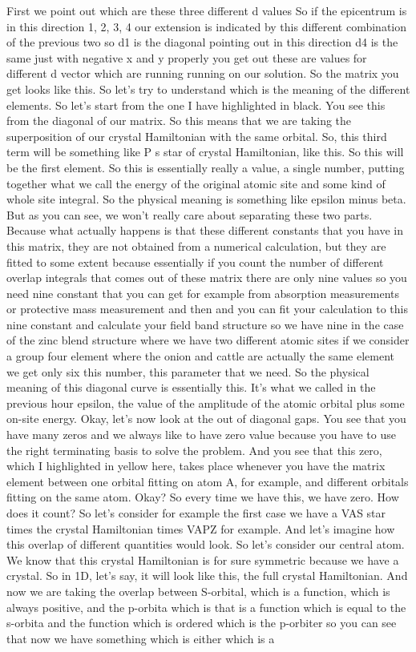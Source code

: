 First we point out which are these three different d values So if the epicentrum is in this direction 1, 2, 3, 4 our extension is indicated by this different combination of the previous two so d1 is the diagonal pointing out in this direction d4 is the same just with negative x and y properly you get out these are values for different d vector which are running running on our solution. So the matrix you get looks like this. So let's try to understand which is the meaning of the different elements. So let's start from the one I have highlighted in black. You see this from the diagonal of our matrix. So this means that we are taking the superposition of our crystal Hamiltonian with the same orbital. So, this third term will be something like P s star of crystal Hamiltonian, like this. So this will be the first element. So this is essentially really a value, a single number, putting together what we call the energy of the original atomic site and some kind of whole site integral. So the physical meaning is something like epsilon minus beta. But as you can see, we won't really care about separating these two parts. Because what actually happens is that these different constants that you have in this matrix, they are not obtained from a numerical calculation, but they are fitted to some extent because essentially if you count the number of different overlap integrals that comes out of these matrix there are only nine values so you need nine constant that you can get for example from absorption measurements or protective mass measurement and then and you can fit your calculation to this nine constant and calculate your field band structure so we have nine in the case of the zinc blend structure where we have two different atomic sites if we consider a group four element where the onion and cattle are actually the same element we get only six this number, this parameter that we need. So the physical meaning of this diagonal curve is essentially this. It's what we called in the previous hour epsilon, the value of the amplitude of the atomic orbital plus some on-site energy. Okay, let's now look at the out of diagonal gaps. You see that you have many zeros and we always like to have zero value because you have to use the right terminating basis to solve the problem. And you see that this zero, which I highlighted in yellow here, takes place whenever you have the matrix element between one orbital fitting on atom A, for example, and different orbitals fitting on the same atom. Okay? So every time we have this, we have zero. How does it count? So let's consider for example the first case we have a VAS star times the crystal Hamiltonian times VAPZ for example. And let's imagine how this overlap of different quantities would look. So let's consider our central atom. We know that this crystal Hamiltonian is for sure symmetric because we have a crystal. So in 1D, let's say, it will look like this, the full crystal Hamiltonian. And now we are taking the overlap between S-orbital, which is a function, which is always positive, and the p-orbita which is that is a function which is equal to the s-orbita and the function which is ordered which is the p-orbiter so you can see that now we have something which is either which is a 